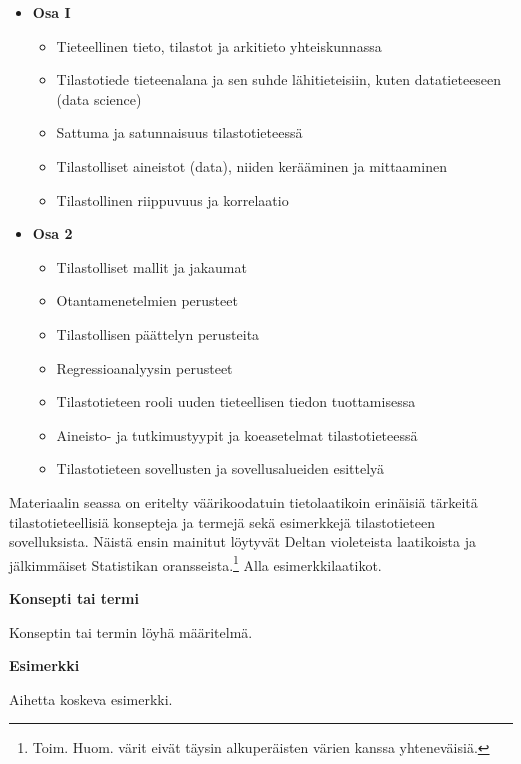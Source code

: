 \documentclass[
]{book}
\providecommand{\tightlist}{%
  \setlength{\itemsep}{0pt}\setlength{\parskip}{0pt}}
\begin{document}
\begin{itemize}
\tightlist
\item
  \textbf{Osa I}

  \begin{itemize}
  \tightlist
  \item
    Tieteellinen tieto, tilastot ja arkitieto yhteiskunnassa
  \item
    Tilastotiede tieteenalana ja sen suhde lähitieteisiin, kuten datatieteeseen (data science)
  \item
    Sattuma ja satunnaisuus tilastotieteessä
  \item
    Tilastolliset aineistot (data), niiden kerääminen ja mittaaminen
  \item
    Tilastollinen riippuvuus ja korrelaatio
  \end{itemize}
\item
  \textbf{Osa 2}

  \begin{itemize}
  \tightlist
  \item
    Tilastolliset mallit ja jakaumat
  \item
    Otantamenetelmien perusteet
  \item
    Tilastollisen päättelyn perusteita
  \item
    Regressioanalyysin perusteet
  \item
    Tilastotieteen rooli uuden tieteellisen tiedon tuottamisessa
  \item
    Aineisto- ja tutkimustyypit ja koeasetelmat tilastotieteessä
  \item
    Tilastotieteen sovellusten ja sovellusalueiden esittelyä
  \end{itemize}
\end{itemize}

Materiaalin seassa on eritelty väärikoodatuin tietolaatikoin erinäisiä tärkeitä tilastotieteellisiä konsepteja ja termejä sekä esimerkkejä tilastotieteen sovelluksista. Näistä ensin mainitut löytyvät Deltan violeteista laatikoista ja jälkimmäiset Statistikan oransseista.\footnote{Toim. Huom. värit eivät täysin alkuperäisten värien kanssa yhteneväisiä.} Alla esimerkkilaatikot.

\begin{defblock}{}
\textbf{Konsepti tai termi}

Konseptin tai termin löyhä määritelmä.

\end{defblock}

\begin{eblock}{}
\textbf{Esimerkki}

Aihetta koskeva esimerkki.

\end{eblock}
\end{document}
